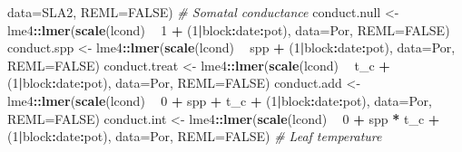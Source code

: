 \documentclass[]{scrartcl}
\newenvironment{Shaded}{\begin{snugshade}}{\end{snugshade}}
\newcommand{\CommentTok}[1]{\textcolor[rgb]{0.56,0.35,0.01}{\textit{#1}}}
\newcommand{\DataTypeTok}[1]{\textcolor[rgb]{0.13,0.29,0.53}{#1}}
\newcommand{\DecValTok}[1]{\textcolor[rgb]{0.00,0.00,0.81}{#1}}
\newcommand{\KeywordTok}[1]{\textcolor[rgb]{0.13,0.29,0.53}{\textbf{#1}}}
\newcommand{\NormalTok}[1]{#1}
\newcommand{\OperatorTok}[1]{\textcolor[rgb]{0.81,0.36,0.00}{\textbf{#1}}}
\newcommand{\OtherTok}[1]{\textcolor[rgb]{0.56,0.35,0.01}{#1}}
\newcommand{\StringTok}[1]{\textcolor[rgb]{0.31,0.60,0.02}{#1}}
\begin{document}
\begin{Shaded}
\begin{Highlighting}[]
{{{{{{{{{{{{{{{{{{{{{{{{{{{{{{{{{{{{{{{{{{{{                          \DataTypeTok{data=}\NormalTok{SLA2, }\DataTypeTok{REML=}\OtherTok{FALSE}\NormalTok{)}
  \CommentTok{# Somatal conductance}
\NormalTok{    conduct.null <-}\StringTok{ }\NormalTok{lme4}\OperatorTok{::}\KeywordTok{lmer}\NormalTok{(}\KeywordTok{scale}\NormalTok{(lcond) }\OperatorTok{~}\StringTok{ }\DecValTok{1} \OperatorTok{+}\StringTok{ }\NormalTok{(}\DecValTok{1}\OperatorTok{|}\NormalTok{block}\OperatorTok{:}\NormalTok{date}\OperatorTok{:}\NormalTok{pot),}
                               \DataTypeTok{data=}\NormalTok{Por, }\DataTypeTok{REML=}\OtherTok{FALSE}\NormalTok{)}
\NormalTok{    conduct.spp <-}\StringTok{ }\NormalTok{lme4}\OperatorTok{::}\KeywordTok{lmer}\NormalTok{(}\KeywordTok{scale}\NormalTok{(lcond) }\OperatorTok{~}\StringTok{ }\NormalTok{spp }\OperatorTok{+}\StringTok{ }\NormalTok{(}\DecValTok{1}\OperatorTok{|}\NormalTok{block}\OperatorTok{:}\NormalTok{date}\OperatorTok{:}\NormalTok{pot), }
                              \DataTypeTok{data=}\NormalTok{Por, }\DataTypeTok{REML=}\OtherTok{FALSE}\NormalTok{)}
\NormalTok{    conduct.treat <-}\StringTok{ }\NormalTok{lme4}\OperatorTok{::}\KeywordTok{lmer}\NormalTok{(}\KeywordTok{scale}\NormalTok{(lcond) }\OperatorTok{~}\StringTok{ }\NormalTok{t_c }\OperatorTok{+}\StringTok{ }\NormalTok{(}\DecValTok{1}\OperatorTok{|}\NormalTok{block}\OperatorTok{:}\NormalTok{date}\OperatorTok{:}\NormalTok{pot), }
                                \DataTypeTok{data=}\NormalTok{Por, }\DataTypeTok{REML=}\OtherTok{FALSE}\NormalTok{)}
\NormalTok{    conduct.add <-}\StringTok{ }\NormalTok{lme4}\OperatorTok{::}\KeywordTok{lmer}\NormalTok{(}\KeywordTok{scale}\NormalTok{(lcond) }\OperatorTok{~}\StringTok{ }\DecValTok{0} \OperatorTok{+}\StringTok{ }\NormalTok{spp }\OperatorTok{+}\StringTok{ }\NormalTok{t_c }\OperatorTok{+}\StringTok{ }\NormalTok{(}\DecValTok{1}\OperatorTok{|}\NormalTok{block}\OperatorTok{:}\NormalTok{date}\OperatorTok{:}\NormalTok{pot), }
                              \DataTypeTok{data=}\NormalTok{Por, }\DataTypeTok{REML=}\OtherTok{FALSE}\NormalTok{)}
\NormalTok{    conduct.int <-}\StringTok{ }\NormalTok{lme4}\OperatorTok{::}\KeywordTok{lmer}\NormalTok{(}\KeywordTok{scale}\NormalTok{(lcond) }\OperatorTok{~}\StringTok{ }\DecValTok{0} \OperatorTok{+}\StringTok{ }\NormalTok{spp }\OperatorTok{*}\StringTok{ }\NormalTok{t_c  }\OperatorTok{+}\StringTok{ }\NormalTok{(}\DecValTok{1}\OperatorTok{|}\NormalTok{block}\OperatorTok{:}\NormalTok{date}\OperatorTok{:}\NormalTok{pot), }
                              \DataTypeTok{data=}\NormalTok{Por, }\DataTypeTok{REML=}\OtherTok{FALSE}\NormalTok{)}
  \CommentTok{# Leaf temperature}
}}}}}}}}}}}}}}}}}}}}}}}}}}}}}}}}}}}}}}}}}}}}
\end{Highlighting}
\end{Shaded}
\end{document}
